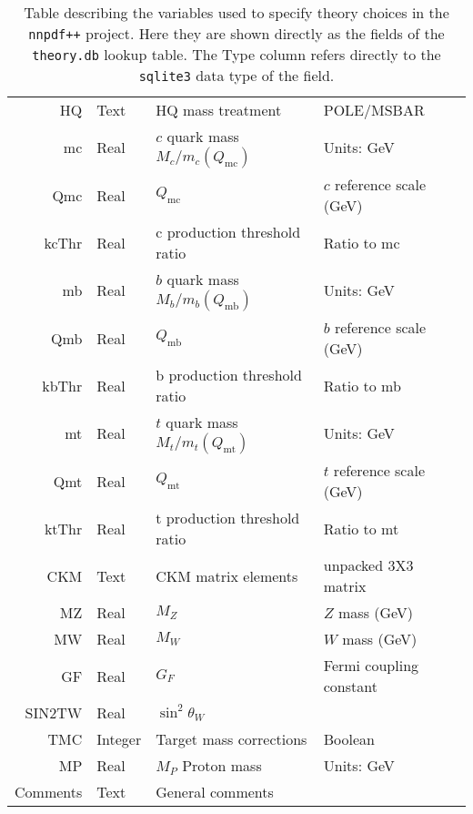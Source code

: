\documentclass[11pt]{article}
\begin{document}
\begin{table}[htp]
\begin{center}
\begin{tabular}{|r|l|l|p{50mm}|}
  HQ        & Text    & HQ mass treatment              & POLE/MSBAR \\
  mc        & Real    & $c$ quark mass $M_c/m_c(Q_{\mathrm{mc}})$   & Units: GeV \\
  Qmc     & Real    & $Q_{\mathrm{mc}}$ & $c$ reference scale (GeV)\\
  kcThr   & Real    & c production threshold ratio & Ratio to mc\\
  mb        & Real    & $b$ quark mass $M_b/m_b(Q_{\mathrm{mb}})$   & Units: GeV \\
  Qmb     & Real    & $Q_{\mathrm{mb}}$ & $b$ reference scale (GeV)\\
 kbThr   & Real    & b production threshold ratio & Ratio to mb\\
  mt        & Real    & $t$ quark mass $M_t/m_t(Q_{\mathrm{mt}})$   & Units: GeV \\
  Qmt     & Real    & $Q_{\mathrm{mt}}$ & $t$ reference scale (GeV)\\
   ktThr   & Real    & t production threshold ratio & Ratio to mt\\
  CKM       & Text    & CKM matrix elements & unpacked 3X3 matrix \\ \pagebreak
  MZ        & Real    & $M_Z$                          & $Z$ mass (GeV) \\
  MW        & Real    & $M_W$                          & $W$ mass (GeV) \\
  GF        & Real    & $G_F$                          & Fermi coupling constant \\
  SIN2TW    & Real    & $\sin^2\theta_W$               & \\
  TMC       & Integer & Target mass corrections        & Boolean \\
  MP        & Real    & $M_P$ Proton mass              & Units: GeV \\
  Comments  & Text    & General comments               & \\               
\hline
\end{tabular}
\caption{Table describing the variables used to specify theory choices in the {\tt nnpdf++} project. Here they are shown directly as the fields of the {\tt theory.db} lookup table. The Type column refers directly to the {\tt sqlite3} data type of the field.}\label{tab:theoryparams}
\end{center}
\end{table}%


\clearpage
\end{document}
